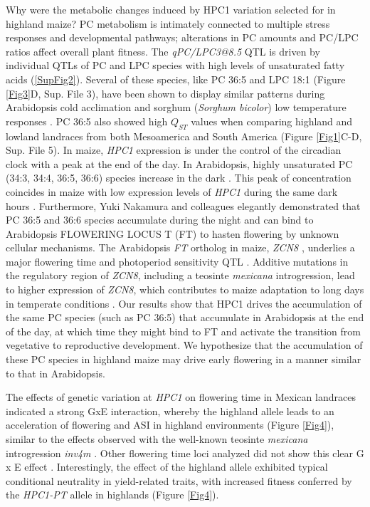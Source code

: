 \documentclass[9pt,twocolumn,twoside,lineno]{BioRxiv}
\begin{document}
Why were the metabolic changes induced by HPC1 variation selected for in highland maize?
PC metabolism is intimately connected to multiple stress responses and developmental pathways; alterations in PC amounts and PC/LPC ratios affect overall plant fitness.
The \textit{qPC/LPC3@8.5} QTL is driven by individual QTLs of PC and LPC species with high levels of unsaturated fatty acids (\ref{SupFig2}).
Several of these species, like PC 36:5 and LPC 18:1 (Figure \ref{Fig3}D, Sup. File 3), have been shown to display similar patterns during Arabidopsis cold acclimation \cite{Welti2002-uk} and sorghum (\textit{Sorghum bicolor}) low temperature responses \cite{Marla2017-ph}.
PC 36:5 also showed high $Q_{ST}$ values when comparing highland and lowland landraces from both Mesoamerica and South America (Figure \ref{Fig1}C-D, Sup. File 5).
In maize, \textit{HPC1} expression is under the control of the circadian clock \cite{Khan2010-iv} with a peak at the end of the day. 
In Arabidopsis, highly unsaturated PC (34:3, 34:4, 36:5, 36:6) species increase in the dark \cite{Maatta2012-ip}. 
This peak of concentration coincides in maize with low expression levels of \textit{HPC1} during the same dark hours \cite{Khan2010-iv}.
Furthermore, Yuki Nakamura and colleagues elegantly demonstrated that PC 36:5 and 36:6 species accumulate during the night and can bind to Arabidopsis FLOWERING LOCUS T (FT) to hasten flowering \cite{Nakamura2014-qf} by unknown cellular mechanisms. 
The Arabidopsis \textit{FT} ortholog in maize, \textit{ZCN8} \cite{Lazakis2011-nq}, underlies a major flowering time and photoperiod sensitivity QTL \cite{Hung2012-ms}.
Additive mutations in the regulatory region of \textit{ZCN8}, including a teosinte \textit{mexicana} introgression, lead to higher expression of \textit{ZCN8}, which contributes to maize adaptation to long days in temperate conditions \cite{Guo2019-pn}.
Our results show that HPC1 drives the accumulation of the same PC species (such as PC 36:5) that accumulate in Arabidopsis at the end of the day, at which time they might bind to FT and activate the transition from vegetative to reproductive development. 
We hypothesize that the accumulation of these PC species in highland maize may drive early flowering in a manner similar to that in Arabidopsis. 

The effects of genetic variation at \textit{HPC1} on flowering time in Mexican landraces indicated a strong GxE interaction, whereby the highland allele leads to an acceleration of flowering and ASI in highland environments (Figure \ref{Fig4}), similar to the effects observed with the well-known teosinte \textit{mexicana} introgression \textit{inv4m} \cite{Crow2020-gene}.
Other flowering time loci analyzed did not show this clear G x E effect \cite{Gates2019-xu}.
Interestingly, the effect of the highland allele exhibited typical conditional neutrality in yield-related traits, with increased fitness conferred by the \textit{HPC1-PT} allele in highlands (Figure \ref{Fig4}).
\end{document}
